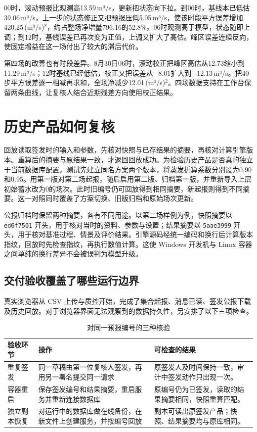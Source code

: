 00时，滚动预报比观测高13.59\,m³/s，更新把状态向下拉。到06时，基线本已低估39.06\,m³/s，上一步的状态修正又把预报压低5.05\,m³/s，使该时段平方误差增加420.25\,(m³/s)$^2$，约占整场净增量796.16的52.8\%。06时观测高于模型，状态随即上调；到12时，基线误差已再次变为正值，上调又扩大了高估。峰区误差连续反向，使固定增益在这一场付出了较大的滞后代价。

第四场的改善也有时段差异。8月30日06时，滚动校正把峰区高估从12.73缩小到11.29\,m³/s；12时基线已经低估，校正又把误差从$-8.01$扩大到$-12.13$\,m³/s。把40步平方误差逐一相减再求和，全场净减少12.01\,(m³/s)$^2$。四场数据支持在工作台保留两条曲线，让复核人结合近期残差方向使用校正结果。

\section{历史产品如何复核}
回放读取签发时的输入和参数，先核对快照与已存结果的摘要，再核对计算引擎版本。重算后的摘要与原结果一致，才返回回放成功。为检验历史产品是否真的独立于当前数据库配置，测试先建立同名方案两个版本，将蒸发折算系数分别设为0.90和0.95。用第一版对第二场起报，随后启用第二版、归档第一版，并重新导入上层初始蓄水改为0的场次。此时旧编号仍可回放得到相同摘要，新起报则得到不同摘要。这一对照同时覆盖了方案切换、旧版归档和原始场次更新。

公报归档时保留两种摘要，各有不同用途。以第二场样例为例，快照摘要以 \texttt{ed6f7501} 开头，用于核对当时的资料、参数与设置；结果摘要以 \texttt{5aae3999} 开头，用于核对基准过程、情景及评价结果。引擎源码经统一编码和换行后计算版本指纹，回放时先检查指纹，再执行数值计算。这使 Windows 开发机与 Linux 容器之间单纯的换行差异不会被误判为模型升级。

\subsection{交付验收覆盖了哪些运行边界}
真实浏览器从 CSV 上传与质控开始，完成了集合起报、消息已读、签发公报下载及历史回放。对于浏览器界面无法观察到的数据持久性，另安排了以下三项检查。
\begin{table}[H]\centering\small\caption{对同一预报编号的三种核验}
\begin{tabularx}{\linewidth}{@{}p{.18\linewidth}LL@{}}\toprule 验收环节 & 操作 & 可检查的结果\\\midrule
重复签发 & 同一草稿由第一位复核人签发，再用另一署名提交同一请求 & 原签发人及时间保持一致，审计中签发动作只出现一次。\\
容器重启 & 保存签发编号和结果摘要，重启服务并重新连接数据库 & 原编号仍为已签发，读取的结果摘要相同，快照重算匹配。\\
独立副本恢复 & 对运行中的数据库做在线备份，在新文件上创建服务，并按编号回放 & 副本可读出原签发产品；快照、结果摘要均与原库相同。\\\bottomrule\end{tabularx}\end{table}

